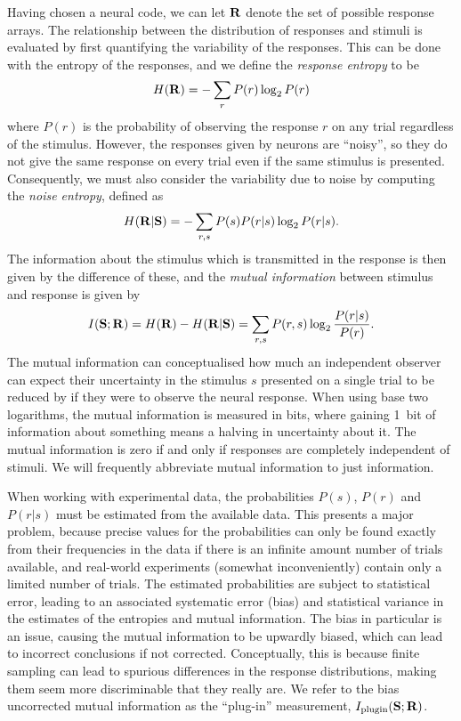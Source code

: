 Having chosen a neural code, we can let $\mathbf{R}$ denote the set of possible response arrays.
The relationship between the distribution of responses and stimuli is evaluated by first quantifying the variability of the responses.
This can be done with the entropy \cite{Shannon1948} of the responses, and we define the \textit{response entropy} to be
\begin{equation}
H( \mathbf{R} )
= - \sum_{r} P(r) \log_2 P(r)
\end{equation}
where $P(r)$ is the probability of observing the response $r$ on any trial regardless of the stimulus.
However, the responses given by neurons are ``noisy'', so they do not give the same response on every trial even if the same stimulus is presented.
Consequently, we must also consider the variability due to noise by computing the \textit{noise entropy}, defined as
\begin{equation}
H( \mathbf{R} | \mathbf{S} )
= - \sum_{r,s} P(s) P(r|s) \log_2 P(r|s)
.\end{equation}
The information about the stimulus which is transmitted in the response is then given by the difference of these, and the \textit{mutual information} between stimulus and response is given by
\begin{equation}
I( \mathbf{S} ; \mathbf{R} )
= H( \mathbf{R} ) - H( \mathbf{R} | \mathbf{S} )
= \sum_{r,s} P(r,s) \log_2 \frac{P(r|s)}{P(r)}
.\end{equation}
The mutual information can conceptualised how much an independent observer can expect their uncertainty in the stimulus $s$ presented on a single trial to be reduced by if they were to observe the neural response.
When using base two logarithms, the mutual information is measured in bits, where gaining \SI{1}{bit} of information about something means a halving in uncertainty about it.
The mutual information is zero if and only if responses are completely independent of stimuli.
We will frequently abbreviate mutual information to just information.

When working with experimental data, the probabilities $P(s)$, $P(r)$ and $P(r|s)$ must be estimated from the available data.
This presents a major problem, because precise values for the probabilities can only be found exactly from their frequencies in the data if there is an infinite amount number of trials available, and real-world experiments (somewhat inconveniently) contain only a limited number of trials.
The estimated probabilities are subject to statistical error, leading to an associated systematic error (bias) and statistical variance in the estimates of the entropies and mutual information.
The bias in particular is an issue, causing the mutual information to be upwardly biased, which can lead to incorrect conclusions if not corrected.
Conceptually, this is because finite sampling can lead to spurious differences in the response distributions, making them seem more discriminable that they really are.
We refer to the bias uncorrected mutual information as the ``plug-in'' measurement, $I_{\text{plugin}}(\mathbf{S};\mathbf{R})$.

